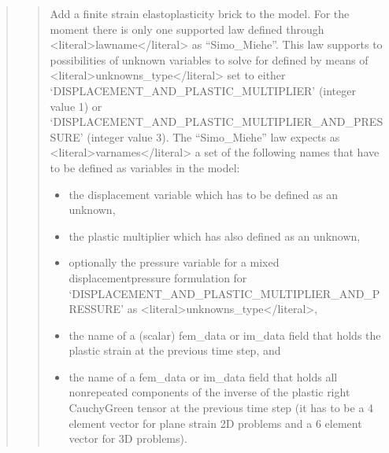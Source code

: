 \documentclass[a4paper,11pt,english]{sphinxmanual}
\begin{document}
\begin{quote}
\sphinxAtStartPar
{}
\begin{quote}

\sphinxAtStartPar
Add a finite strain elastoplasticity brick to the model.
For the moment there is only one supported law defined through
\textless{}literal\textgreater{}lawname\textless{}/literal\textgreater{} as “Simo\_Miehe”.
This law supports to possibilities of unknown variables to solve for
defined by means of \textless{}literal\textgreater{}unknowns\_type\textless{}/literal\textgreater{} set to either
‘DISPLACEMENT\_AND\_PLASTIC\_MULTIPLIER’ (integer value 1) or
‘DISPLACEMENT\_AND\_PLASTIC\_MULTIPLIER\_AND\_PRESSURE’ (integer value 3).
The  “Simo\_Miehe” law expects as \textless{}literal\textgreater{}varnames\textless{}/literal\textgreater{} a set of the
following names that have to be defined as variables in the model:
\begin{itemize}
\item {} 
\sphinxAtStartPar
the displacement variable which has to be defined as an unknown,

\item {} 
\sphinxAtStartPar
the plastic multiplier which has also defined as an unknown,

\item {} 
\sphinxAtStartPar
optionally the pressure variable for a mixed displacement\sphinxhyphen{}pressure
formulation for ‘DISPLACEMENT\_AND\_PLASTIC\_MULTIPLIER\_AND\_PRESSURE’
as \textless{}literal\textgreater{}unknowns\_type\textless{}/literal\textgreater{},

\item {} 
\sphinxAtStartPar
the name of a (scalar) fem\_data or im\_data field that holds the
plastic strain at the previous time step, and

\item {} 
\sphinxAtStartPar
the name of a fem\_data or im\_data field that holds all
non\sphinxhyphen{}repeated components of the inverse of the plastic right
Cauchy\sphinxhyphen{}Green tensor at the previous time step
(it has to be a 4 element vector for plane strain 2D problems
and a 6 element vector for 3D problems).

\end{itemize}


\end{quote}
\end{quote}
\end{document}
